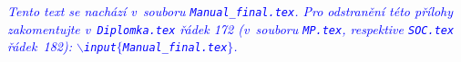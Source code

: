 \textcolor{blue}{\em Tento text se nachází v~souboru \texttt{\cestaStyles Manual\_final.tex}. Pro odstranění této pří\-lo\-hy zakomentujte v~\texttt{Diplomka.tex} řádek 172 (v~souboru \texttt{MP.tex}, respektive \texttt{SOC.tex} řádek~182)\?: \newline \texttt{$\backslash$input$\{$\cestaStyles Manual\_final.tex$\}$}.\/} 
